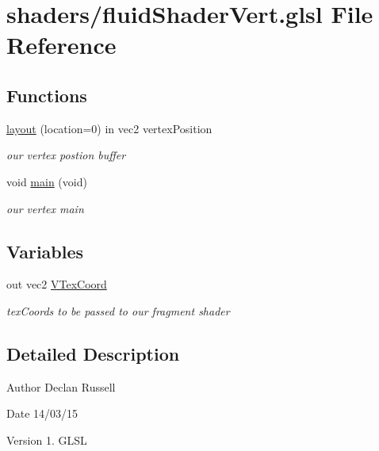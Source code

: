 \hypertarget{fluid_shader_vert_8glsl}{\section{shaders/fluid\-Shader\-Vert.glsl File Reference}
\label{fluid_shader_vert_8glsl}
}
\subsection*{Functions}
\begin{DoxyCompactItemize}
\item 
\hyperlink{fluid_shader_vert_8glsl_a76e82f4a2abee8cef9ec3419ca1ad185}{layout} (location=0) in vec2 vertex\-Position
\begin{DoxyCompactList}\small\item\em our vertex postion buffer \end{DoxyCompactList}\item 
\hypertarget{fluid_shader_vert_8glsl_a6288eba0f8e8ad3ab1544ad731eb7667}{void \hyperlink{fluid_shader_vert_8glsl_a6288eba0f8e8ad3ab1544ad731eb7667}{main} (void)}\label{fluid_shader_vert_8glsl_a6288eba0f8e8ad3ab1544ad731eb7667}

\begin{DoxyCompactList}\small\item\em our vertex main \end{DoxyCompactList}\end{DoxyCompactItemize}
\subsection*{Variables}
\begin{DoxyCompactItemize}
\item 
\hypertarget{fluid_shader_vert_8glsl_a849580e4568e3dc8125d8e541b50a483}{out vec2 \hyperlink{fluid_shader_vert_8glsl_a849580e4568e3dc8125d8e541b50a483}{V\-Tex\-Coord}}\label{fluid_shader_vert_8glsl_a849580e4568e3dc8125d8e541b50a483}

\begin{DoxyCompactList}\small\item\em tex\-Coords to be passed to our fragment shader \end{DoxyCompactList}\end{DoxyCompactItemize}


\subsection{Detailed Description}
\begin{DoxyAuthor}{Author}
Declan Russell 
\end{DoxyAuthor}
\begin{DoxyDate}{Date}
14/03/15 
\end{DoxyDate}
\begin{DoxyVersion}{Version}
1.  G\-L\-S\-L 
\end{DoxyVersion}


